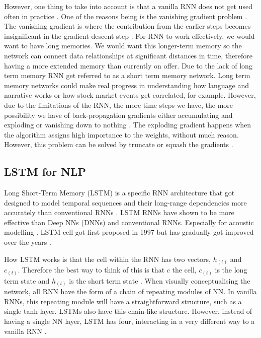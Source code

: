 \documentclass[a4paper,10pt]{article}
\begin{document}
	However, one thing to take into account is that a vanilla RNN does not get used often in practice \cite{grus2019data}. One of the reasons being is the vanishing gradient problem \cite{geron2019hands}. The vanishing gradient is where the contribution from the earlier steps becomes insignificant in the gradient descent step \cite{rnn_lstm_explained}. For RNN to work effectively, we would want to have long memories. We would want this longer-term memory so the network can connect data relationships at significant distances in time, therefore having a more extended memory than currently on offer. Due to the lack of long term memory RNN get referred to as a short term memory network. Long term memory networks could make real progress in understanding how language and narrative works or how stock market events get correlated, for example. However, due to the limitations of the RNN, the more time steps we have, the more possibility we have of back-propagation gradients either accumulating and exploding or vanishing down to nothing \cite{adv_in_ml}. The exploding gradient happens when the algorithm assigns high importance to the weights, without much reason. However, this problem can be solved by truncate or squash the gradients \cite{rnn_lstm_explained}.
	

\subsection{LSTM for NLP}
	
	Long Short-Term Memory (LSTM) is a specific RNN architecture that got designed to model temporal sequences and their long-range dependencies more accurately than conventional RNNs \cite{sak2014long, grus2019data}. LSTM RNNs have shown to be more effective than Deep NNs (DNNs) and conventional RNNs. Especially for acoustic modelling \cite{sak2014long}. LSTM cell got first proposed in 1997 \cite{hochreiter1997long} but has gradually got improved over the years \cite{geron2019hands, sak2014long, zaremba2014recurrent}.  
	
	How LSTM works is that the cell within the RNN has two vectors, $h_{(t)}$ and $c_{(t)}$. Therefore the best way to think of this is that $c$ the cell, $c_{(t)}$ is the long term state and $h_{(t)}$ is the short term state \cite{geron2019hands}. When visually conceptualising the network, all RNN have the form of a chain of repeating modules of NN. In vanilla RNNs, this repeating module will have a straightforward structure, such as a single tanh layer. LSTMs also have this chain-like structure. However, instead of having a single NN layer, LSTM has four, interacting in a very different way to a vanilla RNN \cite{lstm_networks}. 
	
\end{document}
